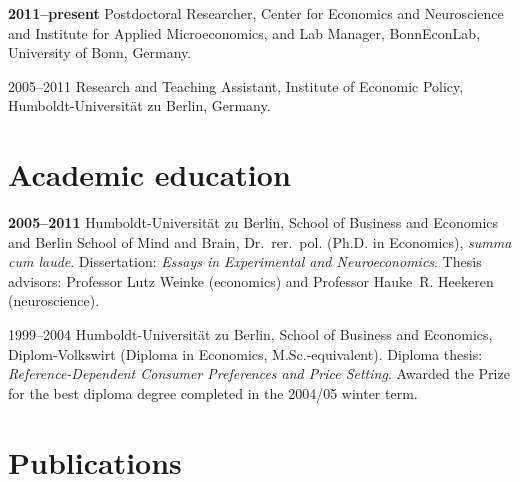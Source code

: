 \documentclass[11pt, a4paper, titleabove]{simplecv}
\newcommand{\caps}[1]{\textscale{0.96}{\addfontfeature{LetterSpace=5}\MakeUppercase{#1}}}
\newcommand{\caps}[1]{\textscale{0.96}{\textls[35]{\MakeUppercase{#1}}}}
\begin{document}
\begin{topic}

	\item[\textbf{2011--present}]
	Postdoctoral Researcher, Center for Economics and Neuroscience and Institute for Applied Microeconomics, and Lab Manager, Bonn\-Econ\-Lab, University of Bonn, Germany.

	\item[2005--2011]
	Research and Teaching Assistant, Institute of Economic Policy, {Humboldt-Universität zu Berlin,} Germany.

\end{topic}


\section{Academic education}

\begin{topic}

	\item[\textbf{2005--2011}]
	{Humboldt-Universität zu Berlin,} School of Business and Economics and Berlin School of Mind and Brain, Dr.~rer.~pol. (Ph.D. in Economics), \textit{summa cum laude}. Dissertation: \textit{Essays in Experimental and Neuroeconomics}. Thesis advisors: Professor Lutz Weinke (economics) and Professor Hauke~R. Heekeren (neuroscience).

	\item[1999--2004]
	{Humboldt-Universität zu Berlin,} School of Business and Economics, {Diplom-Volkswirt} (Diploma in Economics, M.Sc.-equivalent). Diploma thesis: \textit{Reference-Dependent Consumer Preferences and Price Setting}. Awarded the \caps{WWG} Prize for the best diploma degree completed in the 2004/05 winter term.

\end{topic}


\section{Publications}
\end{document}
